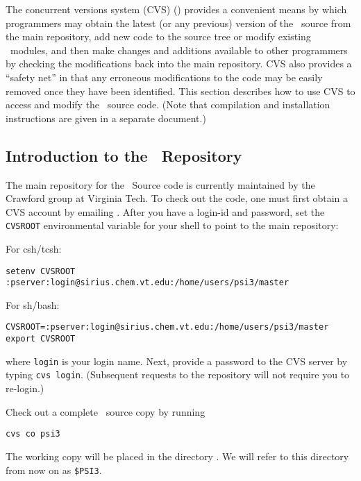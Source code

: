 %
%
%
%

The concurrent versions system (CVS) () provides a convenient means by
which programmers may obtain the latest (or any previous) version of the
\PSIthree\ source from the main repository, add new code to the source
tree or modify existing \PSIthree\ modules, and then make changes and
additions available to other programmers by checking the modifications
back into the main repository.  CVS also provides a ``safety net'' in that
any erroneous modifications to the code may be easily removed once they
have been identified.  This section describes how to use CVS to access and
modify the \PSIthree\ source code.  (Note that compilation and installation
instructions are given in a separate document.)

\subsection{Introduction to the \PSIthree\ Repository} The main
repository for the \PSIthree\ Source code is currently maintained
by the Crawford group at Virginia Tech.  To check out the code, one
must first obtain a CVS account by emailing .
After you have a login-id and password, set the {\tt CVSROOT} environmental
variable for your shell to point to the main repository:

\noindent
For csh/tcsh:
\begin{verbatim}
setenv CVSROOT :pserver:login@sirius.chem.vt.edu:/home/users/psi3/master
\end{verbatim}

\noindent
For sh/bash:
\begin{verbatim}
CVSROOT=:pserver:login@sirius.chem.vt.edu:/home/users/psi3/master
export CVSROOT
\end{verbatim}

\noindent where {\tt login} is your login name.  Next, provide a password
to the CVS server by typing {\tt cvs login}.  (Subsequent requests to the
repository will not require you to re-login.)

\noindent Check out a complete \PSIthree\ source copy by running
\begin{verbatim}
cvs co psi3
\end{verbatim}
The working copy will be placed in the directory .  We will
refer to this directory from now on as {\tt \$PSI3}.

